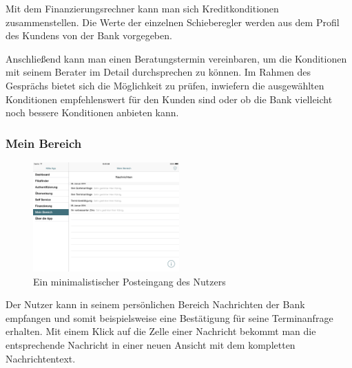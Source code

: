 	Mit dem Finanzierungsrechner kann man sich Kreditkonditionen zusammenstellen. Die Werte der einzelnen Schieberegler werden aus dem Profil des Kundens von der Bank vorgegeben.

	Anschließend kann man einen Beratungstermin vereinbaren, um die Konditionen mit seinem Berater im Detail durchsprechen zu können. Im Rahmen des Gesprächs bietet sich die Möglichkeit zu prüfen, inwiefern die ausgewählten Konditionen empfehlenswert für den Kunden sind oder ob die Bank vielleicht noch bessere Konditionen anbieten kann.

\subsubsection{Mein Bereich}

\begin{figure}[h]
	\centering
  \includegraphics[width=0.5\textwidth]{Pictures/mbereichneu}
	\caption{Ein minimalistischer Posteingang des Nutzers\label{fig10}}
\end{figure}

	Der Nutzer kann in seinem persönlichen Bereich Nachrichten der Bank empfangen und somit beispielsweise eine Bestätigung für seine Terminanfrage erhalten. Mit einem Klick auf die Zelle einer Nachricht bekommt man die entsprechende Nachricht in einer neuen Ansicht mit dem kompletten Nachrichtentext.
\pagebreak
